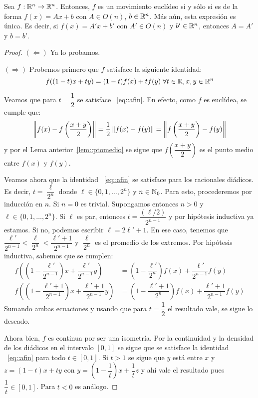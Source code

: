\begin{teo}
Sea $f:\mathbb{R}^n\to\mathbb{R}^n$. Entonces, $f$ es un movimiento euclídeo si y sólo si es de la forma $f(x)=Ax+b$ con $A\in O(n)$, $b\in\mathbb{R}^n$. Más aún, esta expresión es única. Es decir, si $f(x)=A'x+b'$ con $A'\in O(n)$ y $b'\in\mathbb{R}^n$, entonces $A=A'$ y $b=b'$.
\begin{proof}
\hfill

$(\Longleftarrow)$ Ya lo probamos.

$(\Longrightarrow)$ Probemos primero que $f$ satisface la siguiente identidad: \begin{equation}f((1-t)x+ty) = (1-t)f(x) + tf(y) \;\forall t\in\mathbb{R}, x,y\in\mathbb{R}^n\label{eq::afin}\end{equation}

Veamos que para $t=\dfrac{1}{2}$ se satisface ~\ref{eq::afin}. En efecto, como $f$ es euclídea, se cumple que: $$\left\| f(x)-f\left(\dfrac{x+y}{2}\right) \right\| = \dfrac{1}{2}\left\| f(x)-f(y) \right\| = \left\| f\left(\dfrac{x+y}{2}\right)-f(y) \right\|$$ y por el Lema anterior~\ref{lem::ptomedio} se sigue que $f\left(\dfrac{x+y}{2}\right)$ es el punto medio entre $f(x)$ y $f(y)$.

Veamos ahora que la identidad ~\ref{eq::afin} se satisface para los racionales diádicos. Es decir, $t=\dfrac{\ell}{2^n}$ donde $\ell\in\{0,1,\ldots, 2^n\}$ y $n\in\mathbb{N}_{0}$. Para esto, procederemos por inducción en $n$. Si $n=0$ es trivial. Supongamos entonces $n>0$ y $\ell\in\{0,1,\ldots, 2^n\}$. Si $\ell$ es par, entonces $t=\dfrac{(\ell/2)}{2^{n-1}}$ y por hipótesis inductiva ya estamos. Si no, podemos escribir $\ell = 2\ell'+1$. En ese caso, tenemos que $\dfrac{\ell'}{2^{n-1}} < \dfrac{\ell}{2^n} < \dfrac{\ell'+1}{2^{n-1}}$ y $\dfrac{\ell}{2^n}$ es el promedio de los extremos. Por hipótesis inductiva, sabemos que se cumplen: \begin{align*}f\left(\left(1-\dfrac{\ell'}{2^{n-1}}\right) x + \dfrac{\ell'}{2^{n-1}}y\right) &= \left(1-\dfrac{\ell'}{2^n}\right) f(x) + \dfrac{\ell'}{2^{n-1}}f(y) \\ f\left(\left(1-\dfrac{\ell'+1}{2^{n-1}}\right) x + \dfrac{\ell'+1}{2^{n-1}}y\right) &= \left(1-\dfrac{\ell'+1}{2^n}\right) f(x) + \dfrac{\ell'+1}{2^{n-1}}f(y) \end{align*} Sumando ambas ecuaciones y usando que para $t=\dfrac{1}{2}$ el resultado vale, se sigue lo deseado.

Ahora bien, $f$ es continua por ser una isometría. Por la continuidad y la densidad de los diádicos en el intervalo $[0,1]$ se sigue que se satisface la identidad ~\ref{eq::afin} para todo $t\in [0,1]$. Si $t>1$ se sigue que $y$ está entre $x$ y $z=(1-t)x+ty$ con $y = \left(1-\dfrac{1}{t}\right)x + \dfrac{1}{t}z$ y ahí vale el resultado pues $\dfrac{1}{t}\in[0,1]$. Para $t<0$ es análogo.


\end{proof}
\end{teo}
